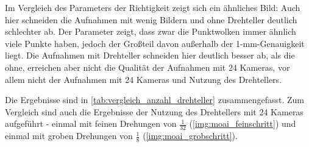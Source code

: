 \documentclass[./00PhotoBox.tex]{subfiles}
\begin{document}
Im Vergleich des Parameters der Richtigkeit zeigt sich ein ähnliches Bild: Auch hier schneiden die Aufnahmen mit wenig Bildern und ohne Drehteller deutlich schlechter ab. Der Parameter zeigt, dass zwar die Punktwolken immer ähnlich viele Punkte haben, jedoch der Großteil davon außerhalb der 1-mm-Genauigkeit liegt. Die Aufnahmen mit Drehteller schneiden hier deutlich besser ab, als die ohne, erreichen aber nicht die Qualität der Aufnahmen mit 24 Kameras, vor allem nicht der Aufnahmen mit 24 Kameras und Nutzung des Drehtellers.

Die Ergebnisse sind in \autoref{tab:vergleich_anzahl_drehteller} zusammengefasst. Zum Vergleich sind auch die Ergebnisse der Nutzung des Drehtellers mit 24 Kameras aufgeführt - einmal mit feinen Drehungen von $\frac{1}{32}$ (\autoref{img:moai_feinschritt}) und einmal mit groben Drehungen von $\frac{1}{8}$ (\autoref{img:moai_grobschritt}).
\end{document}
